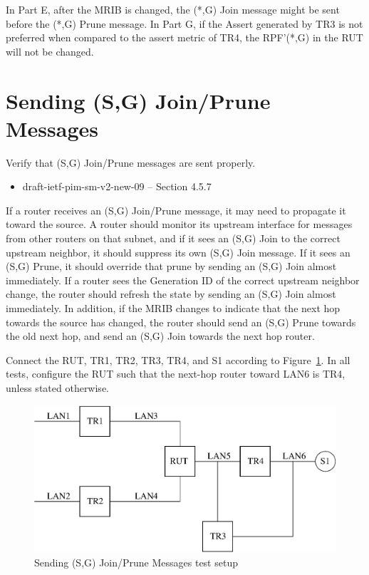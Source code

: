 \documentclass[11pt]{report}
\begin{document}
In Part E, after the MRIB is changed, the (*,G) Join message might
be sent before the (*,G) Prune message. In Part G, if the Assert generated by
TR3 is not preferred when compared to the assert metric of TR4, the RPF'(*,G)
in the RUT will not be changed.

\newpage
\section{Sending (S,G) Join/Prune Messages}

Verify that (S,G) Join/Prune messages are sent properly.

\begin{itemize}
  \item draft-ietf-pim-sm-v2-new-09 -- Section 4.5.7
\end{itemize}

If a router receives an (S,G) Join/Prune message, it may need to propagate
it toward the source. A router should monitor its upstream
interface for messages
from other routers on that subnet, and if it sees an (S,G) Join to the
correct upstream neighbor, it should suppress its own (S,G) Join message.
If it sees an (S,G) Prune, it should override that prune by sending an
(S,G) Join almost immediately. If a router sees the Generation ID of the
correct upstream neighbor change, the router should refresh the state by
sending an (S,G) Join almost immediately. In addition, if the MRIB changes
to indicate that the next hop towards the source has changed, the router should
send an (S,G) Prune towards the old next hop, and send an (S,G) Join
towards the next hop router.

Connect the RUT, TR1, TR2, TR3, TR4, and S1 according to
Figure~\ref{fig:pim_test_4_7_sending_sg_join_prune_messages}.
In all tests, configure the RUT such that the next-hop router toward LAN6 is
TR4, unless stated otherwise.

\begin{figure}[htbp]
  \begin{center}
    \includegraphics[scale=0.8]{figs/pim_test_4_7_sending_sg_join_prune_messages}
    \caption{Sending (S,G) Join/Prune Messages test setup}
    \label{fig:pim_test_4_7_sending_sg_join_prune_messages}
  \end{center}
\end{figure}
\end{document}
